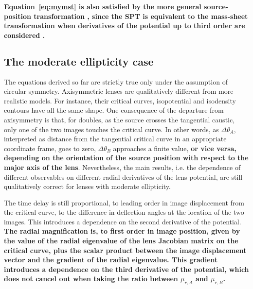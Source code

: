 \documentclass[usenatbib]{mnras}
\def\Eref#1{Equation~\ref{#1}\xspace}
\begin{document}
{\bf \Eref{eq:mymst} is also satisfied by the more general source-position transformation \citep[SPT][]{S+S14}, since the SPT is equivalent to the mass-sheet transformation when derivatives of the potential up to third order are considered \citep[see subsection 3.2 of][]{S+S14}.}

\subsection{The moderate ellipticity case}

The equations derived so far are strictly true only under the assumption of circular symmetry.
Axisymmetric lenses are qualitatively different from more realistic models.
For instance, their critical curves, isopotential and isodensity contours have all the same shape.
One consequence of the departure from axisymmetry is that, for doubles, as the source crosses the tangential caustic, only one of the two images touches the critical curve.
In other words, as $\Delta\theta_A$, interpreted as distance from the tangential critical curve in an appropriate coordinate frame, goes to zero, $\Delta\theta_B$ approaches a finite value, {\bf or vice versa, depending on the orientation of the source position with respect to the major axis of the lens}.
Nevertheless, the main results, i.e. the dependence of different observables on different radial derivatives of the lens potential, are still qualitatively correct for lenses with moderate ellipticity.

The time delay is still proportional, to leading order in image displacement from the critical curve, to the difference in deflection angles at the location of the two images.
This introduces a dependence on the second derivative of the potential.
{\bf The radial magnification is, to first order in image position, given by the value of the radial eigenvalue of the lens Jacobian matrix on the critical curve, plus the scalar product between the image displacement vector and the gradient of the radial eigenvalue.
This gradient introduces a dependence on the third derivative of the potential, which does not cancel out when taking the ratio between $\mu_{r,A}$ and $\mu_{r,B}$.}
\end{document}
